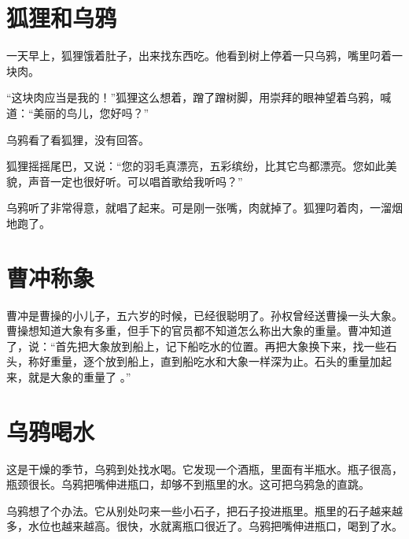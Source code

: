 \documentclass[12pt,UTF-8,openany]{ctexbook}
\begin{document}
\chapter{狐狸和乌鸦}

\begin{large}
    
    一天早上，狐狸饿着肚子，出来找东西吃。他看到树上停着一只乌鸦，嘴里叼着一块肉。
    
    “这块肉应当是我的！”狐狸这么想着，蹭了蹭树脚，用崇拜的眼神望着乌鸦，喊道：“美丽的鸟儿，您好吗？”
    
    乌鸦看了看狐狸，没有回答。
    
    狐狸摇摇尾巴，又说：“您的羽毛真漂亮，五彩缤纷，比其它鸟都漂亮。您如此美貌，声音一定也很好听。可以唱首歌给我听吗？”
    
    乌鸦听了非常得意，就唱了起来。可是刚一张嘴，肉就掉了。狐狸叼着肉，一溜烟地跑了。
    
\end{large}



\chapter{曹冲称象}

\begin{large}
    
    曹冲是曹操的小儿子，五六岁的时候，已经很聪明了。孙权曾经送曹操一头大象。曹操想知道大象有多重，但手下的官员都不知道怎么称出大象的重量。曹冲知道了，说：“首先把大象放到船上，记下船吃水的位置。再把大象换下来，找一些石头，称好重量，逐个放到船上，直到船吃水和大象一样深为止。石头的重量加起来，就是大象的重量了  。”
    
\end{large}



\chapter{乌鸦喝水}

\begin{large}
    
    这是干燥的季节，乌鸦到处找水喝。它发现一个酒瓶，里面有半瓶水。瓶子很高，瓶颈很长。乌鸦把嘴伸进瓶口，却够不到瓶里的水。这可把乌鸦急的直跳。
    
    乌鸦想了个办法。它从别处叼来一些小石子，把石子投进瓶里。瓶里的石子越来越多，水位也越来越高。很快，水就离瓶口很近了。乌鸦把嘴伸进瓶口，喝到了水。
    
\end{large}
\end{document}
